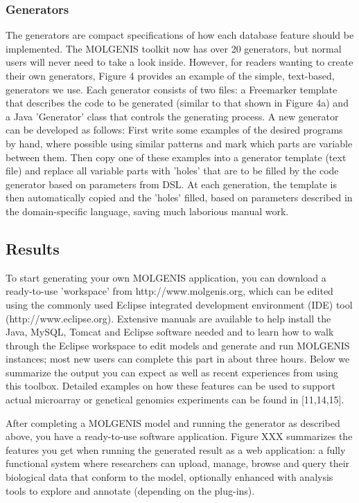 \subsubsection{Generators}
The generators are compact specifications of how each database feature should be implemented. 
The MOLGENIS toolkit now has over 20 generators, but normal users will never need to take a look 
inside. However, for readers wanting to create their own generators, Figure 4 provides an example 
of the simple, text-based, generators we use. Each generator consists of two files: a Freemarker 
template that describes the code to be generated (similar to that shown in Figure 4a) and a Java 
'Generator' class that controls the generating process. A new generator can be developed as 
follows: First write some examples of the desired programs by hand, where possible using similar 
patterns and mark which parts are variable between them. Then copy one of these examples into 
a generator template (text file) and replace all variable parts with 'holes' that 
are to be filled by the code generator based on parameters from DSL. At each generation, the 
template is then automatically copied and the 'holes' filled, based on parameters described in 
the domain-specific language, saving much laborious manual work. 

\subsection{Results}
To start generating your own MOLGENIS application, you can download a ready-to-use 'workspace' 
from http://www.molgenis.org, which can be edited using the commonly used Eclipse integrated 
development environment (IDE) tool (http://www.eclipse.org). Extensive manuals are available to 
help install the Java, MySQL, Tomcat and Eclipse software needed and to learn how to walk through 
the Eclipse workspace to edit models and generate and run MOLGENIS instances; most new users can 
complete this part in about three hours. Below we summarize the output you can expect as well 
as recent experiences from using this toolbox. Detailed examples on how these features can be 
used to support actual microarray or genetical genomics experiments can be found in [11,14,15].

After completing a MOLGENIS model and running the generator as described above, you have a 
ready-to-use software application. Figure XXX summarizes the features you get when running the 
generated result as a web application: a fully functional system where researchers can upload, 
manage, browse and query their biological data that conform to the model, optionally enhanced 
with analysis tools to explore and annotate (depending on the plug-ins).

